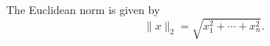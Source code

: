 \documentclass{article}
\begin{document}
The Euclidean norm is given by
\[
  \lVert x\rVert_2=\sqrt{x_1^2+\cdots+x_n^2}.
\]
\end{document}
